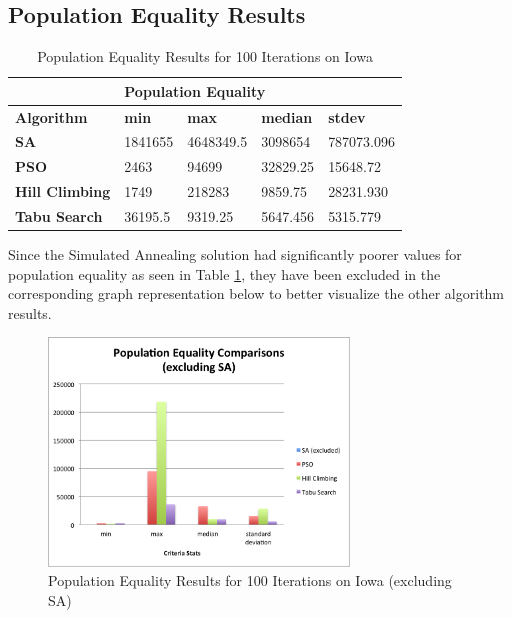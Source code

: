 \documentclass[journal]{IEEEtran}
\begin{document}
\subsection{Population Equality Results}

\begin{table}[!h]
\centering
\caption{Population Equality Results for 100 Iterations on Iowa}
\label{tab:pop_100iter}
\begin{tabular}{l|llll}
                       & \multicolumn{4}{l}{\textbf{Population Equality}}             \\ \hline
\textbf{Algorithm}     & \textbf{min} & \textbf{max} & \textbf{median} & \textbf{stdev} \\ \hline
\textbf{SA}            & 1841655      & 4648349.5    & 3098654         & 787073.096         \\
\textbf{PSO}           & 2463         & 94699        & 32829.25        & 15648.72           \\
\textbf{Hill Climbing} & 1749         & 218283       & 9859.75         & 28231.930        \\
\textbf{Tabu Search}   & 36195.5      & 9319.25         & 5647.456       & 5315.779     
\end{tabular}
\end{table}

Since the Simulated Annealing solution had significantly poorer values for population equality as seen in Table \ref{tab:pop_100iter}, they have been excluded in the corresponding graph representation below to better visualize the other algorithm results.

\begin{figure}[h!]
    \includegraphics[width=8cm]{images/pop_equality_graph.png}
    \centering
    \caption{Population Equality Results for 100 Iterations on Iowa (excluding SA)}
    \label{fig:pop_results}
\end{figure}
\end{document}
